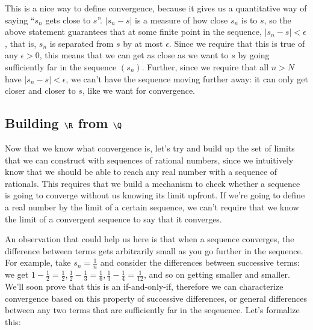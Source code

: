 \documentclass[./analysis.tex]{subfiles}
\begin{document}
    This is a nice way to define convergence, because it gives us a quantitative way of saying ``$s_n$ gets close to $s$''. $|s_n - s|$ is a measure of how close $s_n$ is to $s$, so the above statement guarantees that at some finite point in the sequence, $|s_n - s| < \epsilon$, that is, $s_n$ is separated from $s$ by at most $\epsilon$. Since we require that this is true of any $\epsilon > 0$, this means that we can get as close as we want to $s$ by going sufficiently far in the sequence $(s_n)$. Further, since we require that all $n > N$ have $|s_n - s| < \epsilon$, we can't have the sequence moving further away: it can only get closer and closer to $s$, like we want for convergence.


    \subsection{Building $\R$ from $\Q$}

    Now that we know what convergence is, let's try and build up the set of limits that we can construct with sequences of rational numbers, since we intuitively know that we should be able to reach any real number with a sequence of rationals. This requires that we build a mechanism to check whether a sequence is going to converge without us knowing its limit upfront. If we're going to define a real number by the limit of a certain sequence, we can't require that we know the limit of a convergent sequence to say that it converges. 

    An observation that could help us here is that when a sequence converges, the difference between terms gets arbitrarily small as you go further in the sequence. For example, take $s_n = \frac{1}{n}$ and consider the differences between successive terms: we get $1 - \frac{1}{2} = \frac{1}{2}, \frac{1}{2} - \frac{1}{3} = \frac{1}{6}, \frac{1}{3} - \frac{1}{4} = \frac{1}{12}$, and so on getting smaller and smaller. We'll soon prove that this is an if-and-only-if, therefore we can characterize convergence based on this property of successive differences, or general differences between any two terms that are sufficiently far in the seqeuence. Let's formalize this:
\end{document}
